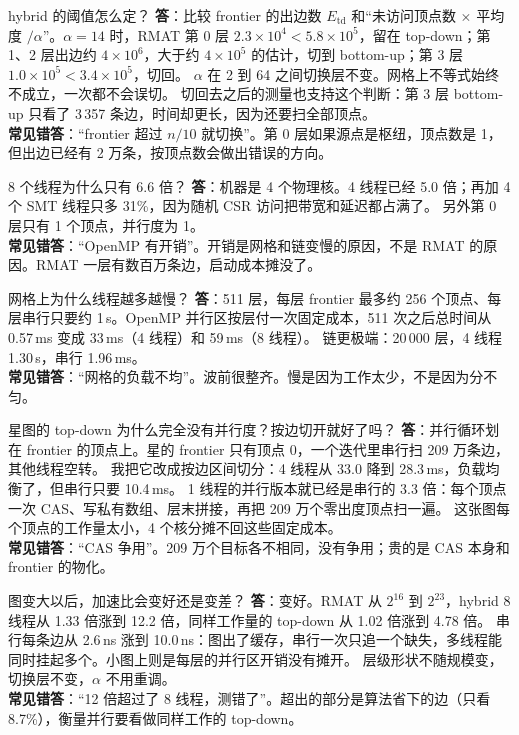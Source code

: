 \documentclass[11pt,a4paper]{ctexart}
\begin{document}
\begin{iqbox}{hybrid 的阈值怎么定？}
\textbf{答}：比较 frontier 的出边数 $E_{\mathrm{td}}$ 和``未访问顶点数 $\times$ 平均度 $/\alpha$''。$\alpha=14$ 时，RMAT 第 0 层 $2.3\times 10^4 < 5.8\times 10^5$，留在 top-down；第 1、2 层出边约 $4\times 10^6$，大于约 $4\times 10^5$ 的估计，切到 bottom-up；第 3 层 $1.0\times 10^5 < 3.4\times 10^5$，切回。
$\alpha$ 在 2 到 64 之间切换层不变。网格上不等式始终不成立，一次都不会误切。
切回去之后的测量也支持这个判断：第 3 层 bottom-up 只看了 3\,357 条边，时间却更长，因为还要扫全部顶点。\\
\textbf{常见错答}：``frontier 超过 $n/10$ 就切换''。第 0 层如果源点是枢纽，顶点数是 1，但出边已经有 2 万条，按顶点数会做出错误的方向。
\end{iqbox}

\begin{iqbox}{8 个线程为什么只有 6.6 倍？}
\textbf{答}：机器是 4 个物理核。4 线程已经 5.0 倍；再加 4 个 SMT 线程只多 31\%，因为随机 CSR 访问把带宽和延迟都占满了。
另外第 0 层只有 1 个顶点，并行度为 1。\\
\textbf{常见错答}：``OpenMP 有开销''。开销是网格和链变慢的原因，不是 RMAT 的原因。RMAT 一层有数百万条边，启动成本摊没了。
\end{iqbox}

\begin{iqbox}{网格上为什么线程越多越慢？}
\textbf{答}：511 层，每层 frontier 最多约 256 个顶点、每层串行只要约 1\,\textmu s。OpenMP 并行区按层付一次固定成本，511 次之后总时间从 0.57\,ms 变成 33\,ms（4 线程）和 59\,ms（8 线程）。
链更极端：20\,000 层，4 线程 1.30\,s，串行 1.96\,ms。\\
\textbf{常见错答}：``网格的负载不均''。波前很整齐。慢是因为工作太少，不是因为分不匀。
\end{iqbox}

\begin{iqbox}{星图的 top-down 为什么完全没有并行度？按边切开就好了吗？}
\textbf{答}：并行循环划在 frontier 的顶点上。星的 frontier 只有顶点 0，一个迭代里串行扫 209 万条边，其他线程空转。
我把它改成按边区间切分：4 线程从 33.0 降到 28.3\,ms，负载均衡了，但串行只要 10.4\,ms。
1 线程的并行版本就已经是串行的 3.3 倍：每个顶点一次 CAS、写私有数组、层末拼接，再把 209 万个零出度顶点扫一遍。
这张图每个顶点的工作量太小，4 个核分摊不回这些固定成本。\\
\textbf{常见错答}：``CAS 争用''。209 万个目标各不相同，没有争用；贵的是 CAS 本身和 frontier 的物化。
\end{iqbox}

\begin{iqbox}{图变大以后，加速比会变好还是变差？}
\textbf{答}：变好。RMAT 从 $2^{16}$ 到 $2^{23}$，hybrid 8 线程从 1.33 倍涨到 12.2 倍，同样工作量的 top-down 从 1.02 倍涨到 4.78 倍。
串行每条边从 2.6\,ns 涨到 10.0\,ns：图出了缓存，串行一次只追一个缺失，多线程能同时挂起多个。小图上则是每层的并行区开销没有摊开。
层级形状不随规模变，切换层不变，$\alpha$ 不用重调。\\
\textbf{常见错答}：``12 倍超过了 8 线程，测错了''。超出的部分是算法省下的边（只看 8.7\%），衡量并行要看做同样工作的 top-down。
\end{iqbox}
\end{document}

